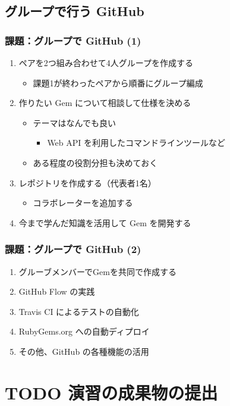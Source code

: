 \documentclass[a4paper,twoside,twocolumn]{bxjsarticle}
\begin{document}
\subsection{グループで行う GitHub}
\label{sec-2-2}
\subsubsection{課題：グループで GitHub (1)}
\label{sec-2-2-1}
\begin{enumerate}
\item ペアを2つ組み合わせて4人グループを作成する
\begin{itemize}
\item 課題1が終わったペアから順番にグループ編成
\end{itemize}
\item 作りたい Gem について相談して仕様を決める
\begin{itemize}
\item テーマはなんでも良い
\begin{itemize}
\item Web API を利用したコマンドラインツールなど
\end{itemize}
\item ある程度の役割分担も決めておく
\end{itemize}
\item レポジトリを作成する（代表者1名）
\begin{itemize}
\item コラボレーターを追加する
\end{itemize}
\item 今まで学んだ知識を活用して Gem を開発する
\end{enumerate}

\subsubsection{課題：グループで GitHub (2)}
\label{sec-2-2-2}
\begin{enumerate}
\item グルーブメンバーでGemを共同で作成する
\item GitHub Flow の実践
\item Travis CI によるテストの自動化
\item RubyGems.org への自動ディプロイ
\item その他、GitHub の各種機能の活用
\end{enumerate}

\section{{\bfseries\sffamily TODO} 演習の成果物の提出}
\label{sec-3}
\end{document}
